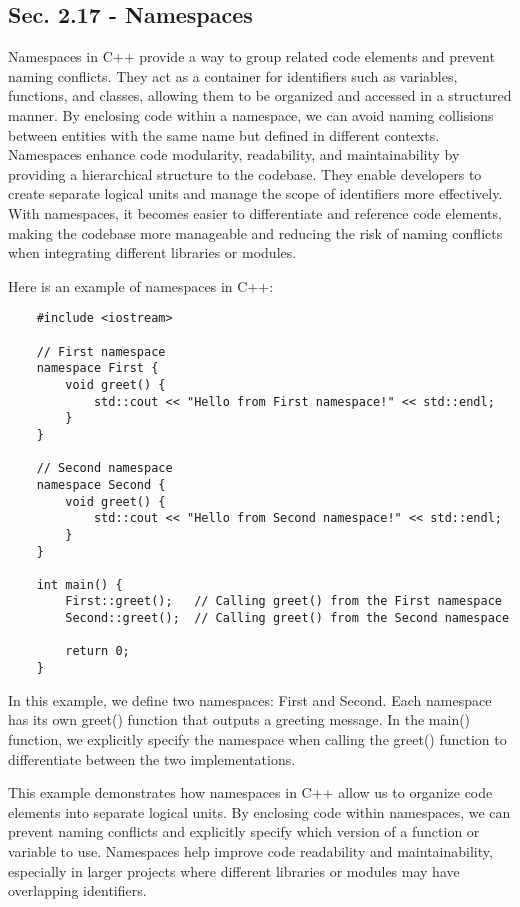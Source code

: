 \subsection*{Sec. 2.17 - Namespaces}

Namespaces in C++ provide a way to group related code elements and prevent naming conflicts. They act as a container for identifiers such as variables, functions, and classes, allowing them to be organized and accessed in a structured manner. By enclosing code within a namespace, we can avoid naming collisions between entities with 
the same name but defined in different contexts. Namespaces enhance code modularity, readability, and maintainability by providing a hierarchical structure to the codebase. They enable developers to create separate logical units and manage the scope of identifiers more effectively. With namespaces, it becomes easier to differentiate 
and reference code elements, making the codebase more manageable and reducing the risk of naming conflicts when integrating different libraries or modules.

\begin{solution}
    Here is an example of namespaces in C++: \\
    \horizontalline
    \begin{verbatim}
    #include <iostream>

    // First namespace
    namespace First {
        void greet() {
            std::cout << "Hello from First namespace!" << std::endl;
        }
    }
    
    // Second namespace
    namespace Second {
        void greet() {
            std::cout << "Hello from Second namespace!" << std::endl;
        }
    }
    
    int main() {
        First::greet();   // Calling greet() from the First namespace
        Second::greet();  // Calling greet() from the Second namespace
    
        return 0;
    }
    \end{verbatim}
    
    \horizontalline

    In this example, we define two namespaces: First and Second. Each namespace has its own greet() function that outputs a greeting message. In the main() function, we explicitly specify the namespace when calling the greet() function to differentiate between the two implementations.

    \noindent This example demonstrates how namespaces in C++ allow us to organize code elements into separate logical units. By enclosing code within namespaces, we can prevent naming conflicts and explicitly specify which version of a function or variable to use. Namespaces help improve code readability and maintainability, 
    especially in larger projects where different libraries or modules may have overlapping identifiers.
\end{solution}

